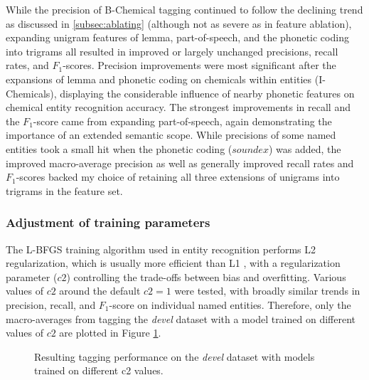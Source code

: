 \documentclass[10pt, oneside]{article}
\begin{document}
While the precision of B-Chemical tagging continued to follow the declining trend as discussed in \ref{subsec:ablating} (although not as severe as in feature ablation), expanding unigram features of lemma, part-of-speech, and the phonetic coding into trigrams all resulted in improved or largely unchanged precisions, recall rates, and $F_1$-scores. Precision improvements were most significant after the expansions of lemma and phonetic coding on chemicals within entities (I-Chemicals), displaying the considerable influence of nearby phonetic features on chemical entity recognition accuracy. The strongest improvements in recall and the $F_1$-score came from expanding part-of-speech, again demonstrating the importance of an extended semantic scope. While precisions of some named entities took a small hit when the phonetic coding ($soundex$) was added, the improved macro-average precision as well as generally improved recall rates and $F_1$-scores backed my choice of retaining all three extensions of unigrams into trigrams in the feature set.

\subsubsection{Adjustment of training parameters}

The L-BFGS training algorithm used in entity recognition performs L2 regularization, which is usually more efficient than L1 \cite{cortes20092}, with a regularization parameter ($c2$) controlling the trade-offs between bias and overfitting. Various values of $c2$ around the default $c2 = 1$ were tested, with broadly similar trends in precision, recall, and $F_1$-score on individual named entities. Therefore, only the macro-averages from tagging the \emph{devel} dataset with a model trained on different values of $c2$ are plotted in Figure \ref{fig:c2}.

\begin{figure}[h]
\begin{center}
\caption{\label{fig:c2} Resulting tagging performance on the \emph{devel} dataset with models trained on different c2 values.}
\end{center}
\end{figure}
\end{document}
